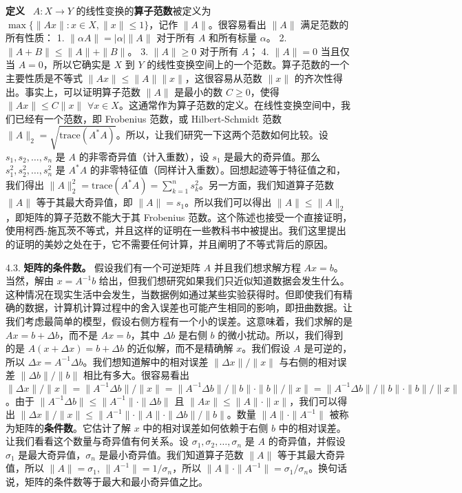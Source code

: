 \textbf{定义}~ $A: X \to Y$ 的线性变换的\textbf{算子范数}被定义为 $\max\{\|Ax\| : x \in X, \|x\| \leq 1\}$，记作 $\|A\|$。很容易看出 $\|A\|$ 满足范数的所有性质：
1. $\|\alpha A\| = |\alpha| \|A\|$ 对于所有 $A$ 和所有标量 $\alpha$。
2. $\|A + B\| \leq \|A\| + \|B\|$。
3. $\|A\| \geq 0$ 对于所有 $A$；
4. $\|A\| = 0$ 当且仅当 $A = 0$，所以它确实是 $X$ 到 $Y$ 的线性变换空间上的一个范数。算子范数的一个主要性质是不等式 $\|Ax\| \leq \|A\|\|x\|$，这很容易从范数 $\|x\|$ 的齐次性得出。事实上，可以证明算子范数 $\|A\|$ 是最小的数 $C \geq 0$，使得 $\|Ax\| \leq C\|x\|$ $\forall x \in X$。这通常作为算子范数的定义。在线性变换空间中，我们已经有一个范数，即 Frobenius 范数，或 Hilbert-Schmidt 范数 $\|A\|_2 = \sqrt{\text{trace}(A^*A)}$。所以，让我们研究一下这两个范数如何比较。设 $s_1, s_2, \dots, s_n$ 是 $A$ 的非零奇异值（计入重数），设 $s_1$ 是最大的奇异值。那么 $s_1^2, s_2^2, \dots, s_n^2$ 是 $A^*A$ 的非零特征值（同样计入重数）。回想起迹等于特征值之和，我们得出 $\|A\|_2^2 = \text{trace}(A^*A) = \sum_{k=1}^n s_k^2$。另一方面，我们知道算子范数 $\|A\|$ 等于其最大奇异值，即 $\|A\| = s_1$。所以我们可以得出 $\|A\| \leq \|A\|_2$，即矩阵的算子范数不能大于其 Frobenius 范数。这个陈述也接受一个直接证明，使用柯西-施瓦茨不等式，并且这样的证明在一些教科书中被提出。我们这里提出的证明的美妙之处在于，它不需要任何计算，并且阐明了不等式背后的原因。

4.3. \textbf{矩阵的条件数。} 假设我们有一个可逆矩阵 $A$ 并且我们想求解方程 $Ax = b$。当然，解由 $x = A^{-1}b$ 给出，但我们想研究如果我们只近似知道数据会发生什么。这种情况在现实生活中会发生，当数据例如通过某些实验获得时。但即使我们有精确的数据，计算机计算过程中的舍入误差也可能产生相同的影响，即扭曲数据。让我们考虑最简单的模型，假设右侧方程有一个小的误差。这意味着，我们求解的是 $Ax = b + \Delta b$，而不是 $Ax = b$，其中 $\Delta b$ 是右侧 $b$ 的微小扰动。所以，我们得到的是 $A(x + \Delta x) = b + \Delta b$ 的近似解，而不是精确解 $x$。我们假设 $A$ 是可逆的，所以 $\Delta x = A^{-1}\Delta b$。我们想知道解中的相对误差 $\| \Delta x \| / \| x \|$ 与右侧的相对误差 $\| \Delta b \| / \| b \|$ 相比有多大。很容易看出 $\| \Delta x \| / \| x \| = \| A^{-1} \Delta b \| / \| x \| = \| A^{-1} \Delta b \| / \| b \| \cdot \| b \| / \| x \| = \| A^{-1} \Delta b \| / \| b \| \cdot \| b \| / \| x \|$。由于 $\| A^{-1} \Delta b \| \leq \| A^{-1} \| \cdot \| \Delta b \|$ 且 $\| Ax \| \leq \| A \| \cdot \| x \|$，我们可以得出 $\| \Delta x \| / \| x \| \leq \| A^{-1} \| \cdot \| A \| \cdot \| \Delta b \| / \| b \|$。数量 $\|A\| \cdot \|A^{-1}\|$ 被称为矩阵的\textbf{条件数}。它估计了解 $x$ 中的相对误差如何依赖于右侧 $b$ 中的相对误差。让我们看看这个数量与奇异值有何关系。设 $\sigma_1, \sigma_2, \dots, \sigma_n$ 是 $A$ 的奇异值，并假设 $\sigma_1$ 是最大奇异值，$\sigma_n$ 是最小奇异值。我们知道算子范数 $\|A\|$ 等于其最大奇异值，所以 $\|A\| = \sigma_1$, $\|A^{-1}\| = 1/\sigma_n$，所以 $\|A\| \cdot \|A^{-1}\| = \sigma_1/\sigma_n$。换句话说，矩阵的条件数等于最大和最小奇异值之比。





